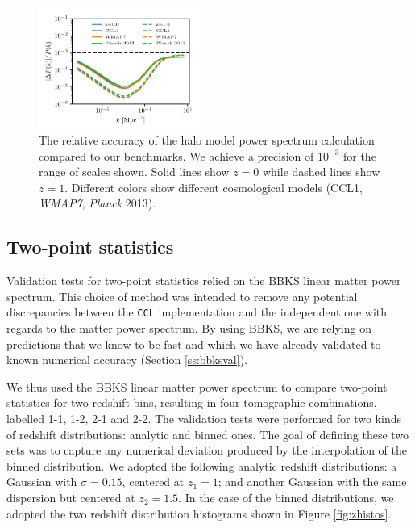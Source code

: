 \documentclass[\docopts]{\docclass}
\newcommand{\ccl}{{\tt CCL}\xspace}
\begin{document}
\begin{figure}
\includegraphics[width=0.49\textwidth]{halo_model_benchmark}
\caption{The relative accuracy of the halo model power spectrum calculation compared to our benchmarks. We achieve a precision of $10^{-3}$ for the range of scales shown. Solid lines show $z=0$ while dashed lines show $z=1$. Different colors show different cosmological models (CCL1, {\it WMAP7}, {\it Planck} 2013).}
\label{fig:halo_model_benchmark}
\end{figure}

\subsection{Two-point statistics}

Validation tests for two-point statistics relied on the BBKS linear matter power spectrum. This choice of method was intended to remove any potential discrepancies between the \ccl implementation and the independent one with regards to the matter power spectrum. By using BBKS, we are relying on predictions that we know to be fast and which we have already validated to known numerical accuracy (Section \ref{ss:bbksval}).

We thus used the BBKS linear matter power spectrum to compare two-point statistics for two redshift bins, resulting in four tomographic combinations, labelled 1-1, 1-2, 2-1 and 2-2. The validation tests were performed for two kinds of redshift distributions: analytic and binned ones. The goal of defining these two sets was to capture any numerical deviation produced by the interpolation of the binned distribution. We adopted the following analytic redshift distributions: a Gaussian with $\sigma = 0.15$, centered at $z_1 = 1$; and another Gaussian with the same dispersion but centered at $z_2 = 1.5$. In the case of the binned distributions, we adopted the two redshift distribution histograms shown in Figure \ref{fig:zhistos}.
\end{document}

